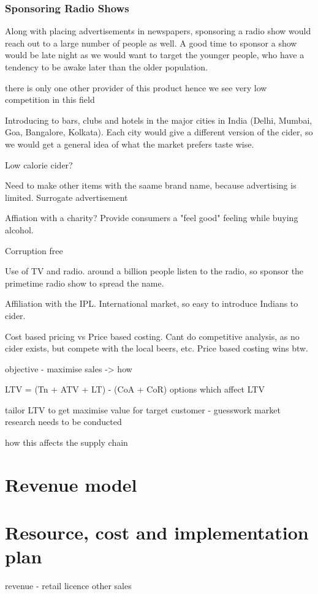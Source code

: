 \documentclass{article}
\begin{document}
\subsubsection{Sponsoring Radio Shows}
Along with placing advertisements in newspapers, sponsoring a radio show would reach
out to a large number of people as well. A good time to sponsor a show would be
late night as we would want to target the younger people, who have a tendency to
be awake later than the older population.
\newpage

there is only one other provider of this product hence we see very low competition in this field 

Introducing to bars, clubs and hotels in the major cities in India (Delhi, Mumbai, Goa,
Bangalore, Kolkata). Each city would give a different version of the cider, so we would
get a general idea of what the market prefers taste wise.

Low calorie cider?

Need to make other items with the saame brand name, because advertising is limited. Surrogate advertisement

Affiation with a charity? Provide consumers a "feel good" feeling while buying alcohol.

Corruption free

Use of TV and radio. around a billion people listen to the radio, so sponsor the primetime radio
show to spread the name.

Affiliation with the IPL. International market, so easy to introduce Indians to cider.

Cost based pricing vs Price based costing. Cant do competitive analysis, as no cider exists, but compete with
the local beers, etc. Price based costing wins btw.



objective - maximise sales -> how

LTV = (Tn + ATV + LT) - (CoA + CoR) 
options which affect LTV

tailor LTV to get maximise value for target customer - guesswork market research
needs to be conducted

how this affects the supply chain
\section{Revenue model}
\section{Resource, cost and implementation plan}
revenue
 - retail
   licence
   other sales
\end{document}
